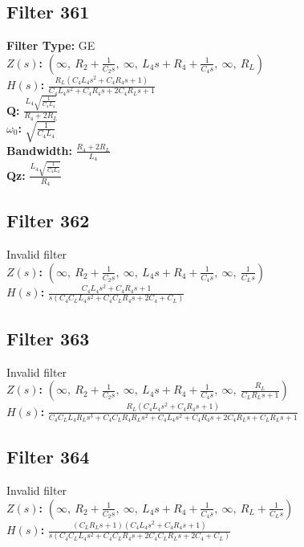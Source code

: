 \documentclass{article}
\begin{document}
\subsection*{Filter 361}
\textbf{Filter Type:} GE \\ 
\textbf{$Z(s)$:} $\left( \infty, \  R_{2} + \frac{1}{C_{2} s}, \  \infty, \  L_{4} s + R_{4} + \frac{1}{C_{4} s}, \  \infty, \  R_{L}\right)$ \\ 
\textbf{$H(s)$:} $\frac{R_{L} \left(C_{4} L_{4} s^{2} + C_{4} R_{4} s + 1\right)}{C_{4} L_{4} s^{2} + C_{4} R_{4} s + 2 C_{4} R_{L} s + 1}$ \\ 
\textbf{Q:} $\frac{L_{4} \sqrt{\frac{1}{C_{4} L_{4}}}}{R_{4} + 2 R_{L}}$ \\ 
\textbf{$\omega_0$:} $\sqrt{\frac{1}{C_{4} L_{4}}}$ \\ 
\textbf{Bandwidth:} $\frac{R_{4} + 2 R_{L}}{L_{4}}$ \\ 
\textbf{Qz:} $\frac{L_{4} \sqrt{\frac{1}{C_{4} L_{4}}}}{R_{4}}$ \\ 
\subsection*{Filter 362}
Invalid filter \\ 
\textbf{$Z(s)$:} $\left( \infty, \  R_{2} + \frac{1}{C_{2} s}, \  \infty, \  L_{4} s + R_{4} + \frac{1}{C_{4} s}, \  \infty, \  \frac{1}{C_{L} s}\right)$ \\ 
\textbf{$H(s)$:} $\frac{C_{4} L_{4} s^{2} + C_{4} R_{4} s + 1}{s \left(C_{4} C_{L} L_{4} s^{2} + C_{4} C_{L} R_{4} s + 2 C_{4} + C_{L}\right)}$ \\ 
\subsection*{Filter 363}
Invalid filter \\ 
\textbf{$Z(s)$:} $\left( \infty, \  R_{2} + \frac{1}{C_{2} s}, \  \infty, \  L_{4} s + R_{4} + \frac{1}{C_{4} s}, \  \infty, \  \frac{R_{L}}{C_{L} R_{L} s + 1}\right)$ \\ 
\textbf{$H(s)$:} $\frac{R_{L} \left(C_{4} L_{4} s^{2} + C_{4} R_{4} s + 1\right)}{C_{4} C_{L} L_{4} R_{L} s^{3} + C_{4} C_{L} R_{4} R_{L} s^{2} + C_{4} L_{4} s^{2} + C_{4} R_{4} s + 2 C_{4} R_{L} s + C_{L} R_{L} s + 1}$ \\ 
\subsection*{Filter 364}
Invalid filter \\ 
\textbf{$Z(s)$:} $\left( \infty, \  R_{2} + \frac{1}{C_{2} s}, \  \infty, \  L_{4} s + R_{4} + \frac{1}{C_{4} s}, \  \infty, \  R_{L} + \frac{1}{C_{L} s}\right)$ \\ 
\textbf{$H(s)$:} $\frac{\left(C_{L} R_{L} s + 1\right) \left(C_{4} L_{4} s^{2} + C_{4} R_{4} s + 1\right)}{s \left(C_{4} C_{L} L_{4} s^{2} + C_{4} C_{L} R_{4} s + 2 C_{4} C_{L} R_{L} s + 2 C_{4} + C_{L}\right)}$ \\ 
\end{document}
